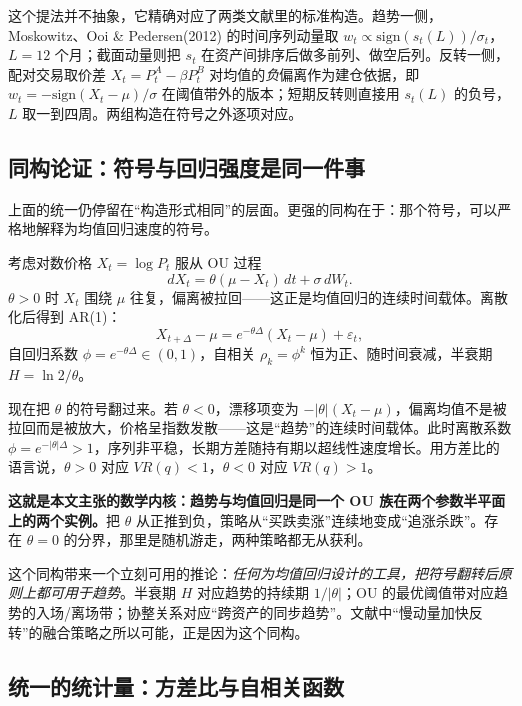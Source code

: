 这个提法并不抽象，它精确对应了两类文献里的标准构造。趋势一侧，Moskowitz、Ooi \& Pedersen(2012) 的时间序列动量取
$w_t \propto \mathrm{sign}(s_t(L))/\sigma_t$，$L=12$ 个月\cite{mop2012}；截面动量则把 $s_t$ 在资产间排序后做多前列、做空后列\cite{jegadeesh1993}。反转一侧，配对交易取价差 $X_t=P^A_t-\beta P^B_t$ 对均值的\emph{负}偏离作为建仓依据，即 $w_t=-\mathrm{sign}(X_t-\mu)/\sigma$ 在阈值带外的版本\cite{gatev2006,elliott2005}；短期反转则直接用 $s_t(L)$ 的负号，$L$ 取一到四周\cite{lehmann1990,jegadeesh1990}。两组构造在符号之外逐项对应。

\subsection{同构论证：符号与回归强度是同一件事}

上面的统一仍停留在“构造形式相同”的层面。更强的同构在于：那个符号，可以严格地解释为均值回归速度的符号。

考虑对数价格 $X_t=\log P_t$ 服从 OU 过程
\begin{equation}
dX_t=\theta(\mu-X_t)\,dt+\sigma\,dW_t .
\end{equation}
$\theta>0$ 时 $X_t$ 围绕 $\mu$ 往复，偏离被拉回——这正是均值回归的连续时间载体\cite{uo1930,vasicek1977}。离散化后得到 AR(1)：
\begin{equation}
X_{t+\Delta}-\mu=e^{-\theta\Delta}\left(X_t-\mu\right)+\varepsilon_t ,
\end{equation}
自回归系数 $\phi=e^{-\theta\Delta}\in(0,1)$，自相关 $\rho_k=\phi^{k}$ 恒为正、随时间衰减，半衰期 $H=\ln 2/\theta$。

现在把 $\theta$ 的符号翻过来。若 $\theta<0$，漂移项变为 $-|\theta|(X_t-\mu)$，偏离均值不是被拉回而是被放大，价格呈指数发散——这是“趋势”的连续时间载体。此时离散系数 $\phi=e^{-|\theta|\Delta}>1$，序列非平稳，长期方差随持有期以超线性速度增长。用方差比的语言说，$\theta>0$ 对应 $VR(q)<1$，$\theta<0$ 对应 $VR(q)>1$。

\textbf{这就是本文主张的数学内核：趋势与均值回归是同一个 OU 族在两个参数半平面上的两个实例。}把 $\theta$ 从正推到负，策略从“买跌卖涨”连续地变成“追涨杀跌”。存在 $\theta=0$ 的分界，那里是随机游走，两种策略都无从获利。

这个同构带来一个立刻可用的推论：\emph{任何为均值回归设计的工具，把符号翻转后原则上都可用于趋势}。半衰期 $H$ 对应趋势的持续期 $1/|\theta|$；OU 的最优阈值带对应趋势的入场/离场带；协整关系对应“跨资产的同步趋势”。文献中“慢动量加快反转”的融合策略之所以可能，正是因为这个同构\cite{wood2021}。

\subsection{统一的统计量：方差比与自相关函数}

